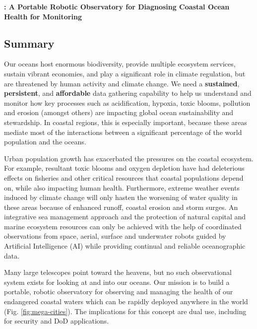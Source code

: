 \documentclass[12pt]{article}
\begin{document}
\vspace*{1cm}
\begin{center}
  {\large \bf{\proe}: A Portable Robotic Observatory for Diagnosing Coastal Ocean Health for Monitoring}\\
\end{center}


\subsection{Summary}


Our oceans host enormous biodiversity, provide multiple ecosystem
services, sustain vibrant economies, and play a significant role in
climate regulation, but are threatened by human activity and climate
change.  We need a \textbf{sustained}, \textbf{persistent}, and
\textbf{affordable} data gathering capability to help us understand
and monitor how key processes such as acidification, hypoxia, toxic
blooms, pollution and erosion (amongst others) are impacting global
ocean sustainability and stewardship.  In coastal regions, this is
especially important, because these areas mediate most of the
interactions between a significant percentage of the world population
and the oceans. 

Urban population growth has exacerbated the pressures on the coastal
ecosystem.  For example, resultant toxic blooms and oxygen depletion
have had deleterious effects on fisheries and other critical resources
that coastal populations depend on, while also impacting human
health. Furthermore, extreme weather events induced by climate change
will only hasten the worsening of water quality in these areas because
of enhanced runoff, coastal erosion and storm surges. An integrative
sea management approach and the protection of natural capital and
marine ecosystem resources can only be achieved with the help of
coordinated observations from space, aerial, surface and underwater
robots guided by Artificial Intelligence (AI) while providing
continual and reliable oceanographic data.

Many large telescopes point toward the heavens, but no such
observational system exists for looking at and into our oceans.  Our
mission is to build a portable, robotic observatory for observing and
managing the health of our endangered coastal waters which can be
rapidly deployed anywhere in the world
(Fig. \ref{fig:mega-cities}). The implications for this concept are
dual use, including for security and DoD applications. 
\end{document}
